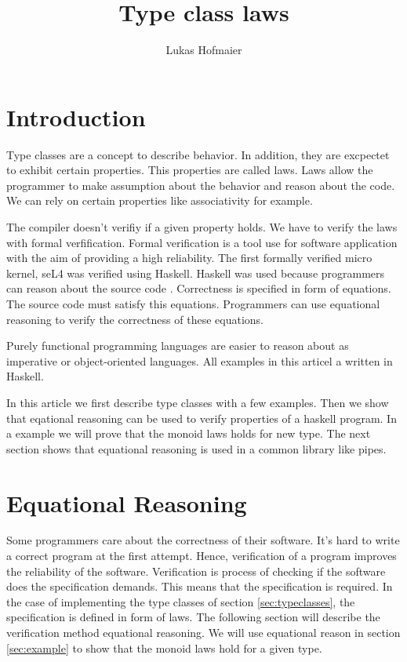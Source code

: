 \documentclass[twoside, a4paper]{article}
\author{Lukas Hofmaier}
\title{Type class laws}
\begin{document}
\maketitle
\tableofcontents

\section{Introduction}
\label{sec:intro}

Type classes are a concept to describe behavior. In addition, they are excpectet to exhibit certain properties. This properties are called laws. 
Laws allow the programmer to make assumption about the behavior and reason about the code. We can rely on certain properties like associativity for example.

The compiler doesn't verifiy if a given property holds. We have to verify the laws with formal verfification. Formal verification is a tool use for software application with the aim of providing a high reliability. The first formally verified micro kernel, seL4 was verified using Haskell. Haskell was used because programmers can reason about the source code \cite{Klein09}. Correctness is specified in form of equations. The source code must satisfy this equations. Programmers can use equational reasoning to verify the correctness of these equations.

Purely functional programming languages are easier to reason about as imperative or object-oriented languages. All examples in this articel a written in Haskell.

In this article we first describe type classes with a few examples. Then we show that eqational reasoning can be used to verify properties of a haskell program. In a example we will prove that the monoid laws holds for new type. The next section shows that equational reasoning is used in a common library like pipes.



\section{Equational Reasoning}
\label{sec:equationalreasoning}

Some programmers care about the correctness of their software. It's hard to write a correct program at the first attempt. 
Hence, verification of a program improves the reliability of the software. Verification is process of checking if the software does the specification demands. This means that the specification is required. In the case of implementing the type classes of section \ref{sec:typeclasses}, the specification is defined in form of laws. The following section will describe the verification method equational reasoning. We will use equational reason in section \ref{sec:example} to show that the monoid laws hold for a given type.
\end{document}
